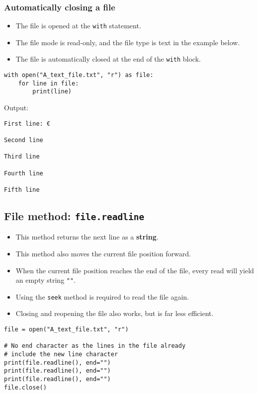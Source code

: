 \documentclass[11pt]{article}
\begin{document}
\subsubsection{Automatically closing a file}
\label{sec:orgd207185}
\begin{itemize}
\item The file is opened at the \texttt{with} statement.
\item The file mode is read-only, and the file type is text in the example below.
\item The file is automatically closed at the end of the \texttt{with} block.
\end{itemize}

\begin{verbatim}
with open("A_text_file.txt", "r") as file:
    for line in file:
        print(line)
\end{verbatim}

 \noindent Output:

\begin{verbatim}
First line: €

Second line

Third line

Fourth line

Fifth line

\end{verbatim}

\subsection{File method: \texttt{file.readline}}
\label{sec:orgf67b39d}
\begin{itemize}
\item This method returns the next line as a \textbf{string}.
\item This method also moves the current file position forward.
\item When the current file position reaches the end of the file, every read will yield an empty string \texttt{""}.
\item Using the \texttt{seek} method is required to read the file again.
\item Closing and reopening the file also works, but is far less efficient.
\end{itemize}

\begin{verbatim}
file = open("A_text_file.txt", "r")

# No end character as the lines in the file already
# include the new line character
print(file.readline(), end="")
print(file.readline(), end="")
print(file.readline(), end="")
file.close()
\end{verbatim}
\end{document}
